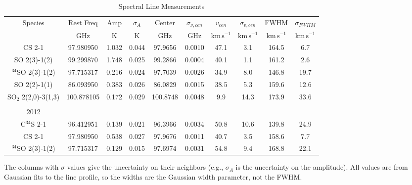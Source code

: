 \begin{table*}[htp]
\centering
\caption{Spectral Line Measurements}
\begin{tabular}{cccccccccc}
\label{tab:spectral_measurements}
Species & Rest Freq & Amp & $\sigma_{A}$ & Center & $\sigma_{\nu,cen}$ & $v_{cen}$ & $\sigma_{v,cen}$ & FWHM & $\sigma_{FWHM}$ \\
 & $\mathrm{GHz}$ & $\mathrm{K}$ & $\mathrm{K}$ & $\mathrm{GHz}$ & $\mathrm{GHz}$ & $\mathrm{km\,s^{-1}}$ & $\mathrm{km\,s^{-1}}$ & $\mathrm{km\,s^{-1}}$ & $\mathrm{km\,s^{-1}}$ \\
\hline
CS 2-1 & 97.980950 & 1.032 & 0.044 & 97.9656 & 0.0010 & 47.1 & 3.1 & 164.5 & 6.7 \\
SO 2(3)-1(2) & 99.299870 & 1.748 & 0.025 & 99.2866 & 0.0004 & 40.1 & 1.1 & 161.2 & 2.6 \\
$^{34}$SO 2(3)-1(2) & 97.715317 & 0.216 & 0.024 & 97.7039 & 0.0026 & 34.9 & 8.0 & 146.8 & 19.7 \\
SO 2(2)-1(1) & 86.093950 & 0.383 & 0.026 & 86.0829 & 0.0015 & 38.5 & 5.3 & 159.6 & 12.6 \\
SO$_2$ 2(2,0)-3(1,3) & 100.878105 & 0.172 & 0.029 & 100.8748 & 0.0048 & 9.9 & 14.3 & 173.9 & 33.6 \\
\hline \\
2012\\
\hline
C$^{34}$S 2-1  & 96.412951 & 0.139 & 0.021 & 96.3966 & 0.0034 & 50.8 & 10.6 & 139.8 & 24.9 \\
CS 2-1  & 97.980950 & 0.538 & 0.027 & 97.9676 & 0.0011 & 40.7 & 3.5 & 158.6 & 7.7 \\
$^{34}$SO 2(3)-1(2)  & 97.715317 & 0.129 & 0.015 & 97.6974 & 0.0031 & 54.8 & 9.4 & 168.8 & 22.1 \\
\hline
\end{tabular}
\par
The columns with $\sigma$ values give the uncertainty on their neighbors (e.g., $\sigma_A$ is the uncertainty on the amplitude).
All values are from Gaussian fits to the line profile, so the widths are the Gaussian width parameter, not the FWHM.

\end{table*}
